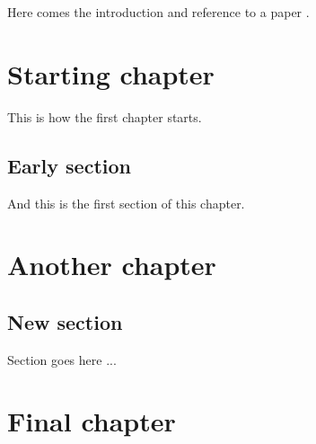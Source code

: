 \documentclass{article}
\begin{document}
Here comes the introduction and reference to a paper \cite{Konr01cm}.

\section{Starting chapter}  %

This is how the first chapter starts.

\subsection{Early section}  %

And this is the first section of this chapter.

\section{Another chapter}  %

\subsection{New section}  %

Section goes here ...

\section{Final chapter}  %
\end{document}
